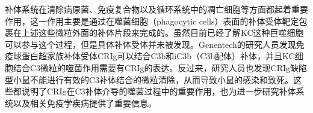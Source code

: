 补体系统在清除病原菌、免疫复合物以及循环系统中的凋亡细胞等方面都起着重要作用，这一作用主要是通过在噬菌细胞（phagocytic
cells）表面的补体受体靶定包裹在上述这些微粒外面的补体片段来完成的。虽然目前已经了解KC这种巨噬细胞可以参与这个过程，但是具体补体受体并未被发现。Genentech的研究人员发现免疫球蛋白超家族补体受体CRIg可以结合C3b和iC3b（C3b配体）补体，并且KC细胞结合C3微粒的噬菌作用需要有CRIg的表达。反过来，研究人员也发现CRIg缺陷型小鼠不能进行有效的C3补体结合的微粒清除，从而导致小鼠的感染和致死。这些都说明了CRIg在C3补体介导的噬菌过程中的重要作用，也为进一步研究补体系统以及相关免疫学疾病提供了重要信息。

